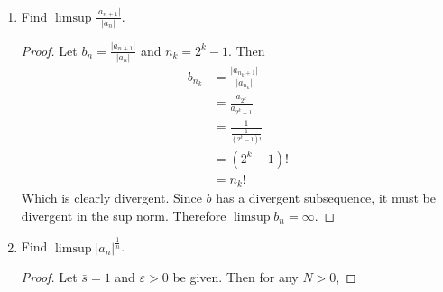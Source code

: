 \documentclass{article}
\begin{document}
\begin{enumerate}
\begin{enumerate}
\begin{proof}
\begin{align*}
                                    a_{n_o} & = \frac{1}{n_o!}             \\
                                            & \leq \frac{1}{n_o}           \\
                                            & \leq \frac{1}{N}             \\
                                            & \leq \varepsilon             \\
                                            & = 0 + \varepsilon            \\
                                            & = \underline{s}+\varepsilon.
                              \end{align*}
                              Therefore, $\liminf a_n=0$.
                        \end{proof}
                  \item Find $\limsup\frac{\lvert a_{n+1}\rvert}{\lvert a_n\rvert}$.
                        \begin{proof}
                              Let $b_n=\frac{\lvert a_{n+1}\rvert}{\lvert a_n\rvert}$
                              and $n_k=2^k-1$. Then
                              \begin{align*}
                                    b_{n_k} & = \frac{\lvert a_{n_k+1}\rvert}{\lvert a_{n_k}\rvert} \\
                                            & = \frac{a_{2^k}}{a_{2^k-1}}                           \\
                                            & = \frac{1}{\frac{1}{(2^k-1)!}}                        \\
                                            & = (2^k-1)!                                            \\
                                            & = n_k!
                              \end{align*}
                              Which is clearly divergent. Since $b$ has a divergent
                              subsequence, it must be divergent in the sup norm.
                              Therefore $\limsup b_n = \infty$.
                        \end{proof}
                  \item Find $\limsup\lvert a_n\rvert^\frac{1}{n}$.
                        \begin{proof}
                              Let $\bar s = 1$ and $\varepsilon>0$ be given.
                              Then for any $N>0$,

\end{proof}
\end{enumerate}
\end{enumerate}
\end{document}
